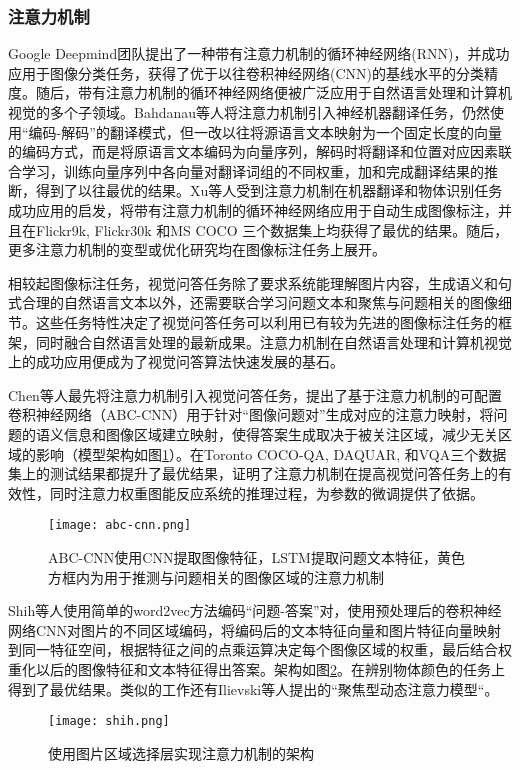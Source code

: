 \subsubsection{注意力机制}
Google Deepmind团队提出了一种带有注意力机制的循环神经网络(RNN)，并成功应用于图像分类任务，获得了优于以往卷积神经网络(CNN)的基线水平的分类精度。随后，带有注意力机制的循环神经网络便被广泛应用于自然语言处理和计算机视觉的多个子领域。Bahdanau等人将注意力机制引入神经机器翻译任务，仍然使用“编码-解码”的翻译模式，但一改以往将源语言文本映射为一个固定长度的向量的编码方式，而是将原语言文本编码为向量序列，解码时将翻译和位置对应因素联合学习，训练向量序列中各向量对翻译词组的不同权重，加和完成翻译结果的推断，得到了以往最优的结果。Xu等人受到注意力机制在机器翻译和物体识别任务成功应用的启发，将带有注意力机制的循环神经网络应用于自动生成图像标注，并且在Flickr9k, Flickr30k 和MS COCO 三个数据集上均获得了最优的结果。随后，更多注意力机制的变型或优化研究均在图像标注任务上展开。

相较起图像标注任务，视觉问答任务除了要求系统能理解图片内容，生成语义和句式合理的自然语言文本以外，还需要联合学习问题文本和聚焦与问题相关的图像细节。这些任务特性决定了视觉问答任务可以利用已有较为先进的图像标注任务的框架，同时融合自然语言处理的最新成果。注意力机制在自然语言处理和计算机视觉上的成功应用便成为了视觉问答算法快速发展的基石。

Chen等人最先将注意力机制引入视觉问答任务，提出了基于注意力机制的可配置卷积神经网络（ABC-CNN）用于针对“图像问题对”生成对应的注意力映射，将问题的语义信息和图像区域建立映射，使得答案生成取决于被关注区域，减少无关区域的影响（模型架构如图\ref{abc-cnn}）。在Toronto COCO-QA, DAQUAR, 和VQA三个数据集上的测试结果都提升了最优结果，证明了注意力机制在提高视觉问答任务上的有效性，同时注意力权重图能反应系统的推理过程，为参数的微调提供了依据。
\begin{figure}[H]
	\centering
	\texttt{[image: abc-cnn.png]}
	\caption{ABC-CNN使用CNN提取图像特征，LSTM提取问题文本特征，黄色方框内为用于推测与问题相关的图像区域的注意力机制}
	\label{abc-cnn}
\end{figure}

Shih等人使用简单的word2vec方法编码“问题-答案”对，使用预处理后的卷积神经网络CNN对图片的不同区域编码，将编码后的文本特征向量和图片特征向量映射到同一特征空间，根据特征之间的点乘运算决定每个图像区域的权重，最后结合权重化以后的图像特征和文本特征得出答案。架构如图\ref{shih}。在辨别物体颜色的任务上得到了最优结果。类似的工作还有Ilievski等人提出的“聚焦型动态注意力模型“。
\begin{figure}[H]
	\centering
	\texttt{[image: shih.png]}
	\caption{使用图片区域选择层实现注意力机制的架构}
	\label{shih}
\end{figure}

